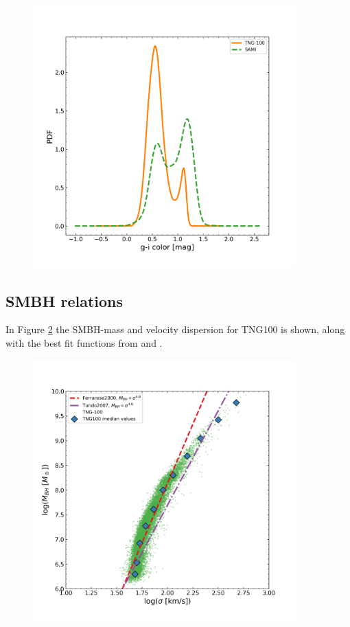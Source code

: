 \begin{figure}
    \centering
    \includegraphics[width=0.9\textwidth]{images/results_pdf_g_i_band.png}
    \caption{}
    \label{pdf_color_res2}
\end{figure}

\subsection{SMBH relations}
In Figure \ref{bh_res} the SMBH-mass and velocity dispersion for TNG100 is shown, along with the best fit functions from \cite{Ferrarese2000} and \cite{Tundo2007}.

\begin{figure}
    \centering
    \includegraphics[width=0.9\textwidth]{images/results_mass_BH_sigma.png}
    \caption{}
    \label{bh_res}
\end{figure}